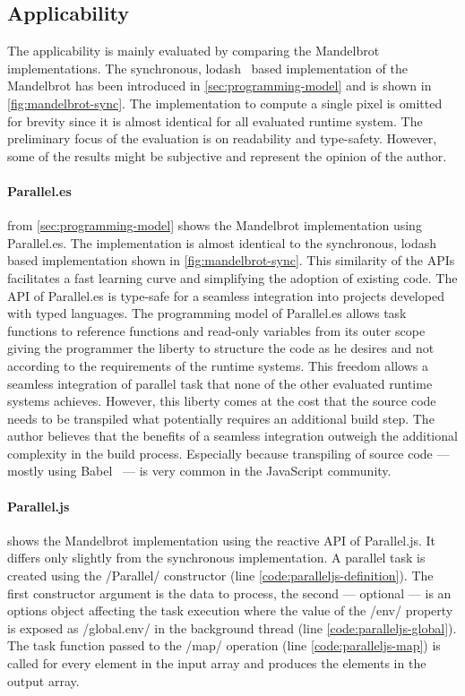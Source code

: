 \subsection{Applicability}
The applicability is mainly evaluated by comparing the Mandelbrot implementations. The synchronous, lodash~\cite{lodash} based implementation of the Mandelbrot has been introduced in \cref{sec:programming-model} and is shown in \cref{fig:mandelbrot-sync}. The implementation to compute a single pixel is  omitted for brevity since it is almost identical for all evaluated runtime system. The preliminary focus of the evaluation is on readability and type-safety. However, some of the results might be subjective and represent the opinion of the author. 

\paragraph{Parallel.es}
 from \cref{sec:programming-model} shows the Mandelbrot implementation using Parallel.es. The implementation is almost identical to the synchronous, lodash~\cite{lodash} based implementation shown in \cref{fig:mandelbrot-sync}. This similarity of the APIs facilitates a fast learning curve and simplifying the adoption of existing code. The API of Parallel.es is type-safe for a seamless integration into projects developed with typed languages. The programming model of Parallel.es allows task functions to reference functions and read-only variables from its outer scope giving the programmer the liberty to structure the code as he desires and not according to the requirements of the runtime systems. This freedom allows a seamless integration of parallel task that none of the other evaluated runtime systems achieves. However, this liberty comes at the cost that the source code needs to be transpiled what potentially requires an additional build step. The author believes that the benefits of a seamless integration outweigh the additional complexity in the build process. Especially because transpiling of source code --- mostly using Babel~\cite{babel} --- is very common in the JavaScript community. 

\paragraph{Parallel.js}
 shows the Mandelbrot implementation using the reactive API of Parallel.js. It differs only slightly from the synchronous implementation. A parallel task is created using the \javascriptinline/Parallel/ constructor (line \ref{code:paralleljs-definition}). The first constructor argument is the data to process, the second --- optional ---  is an options object affecting the task execution where the value of the \javascriptinline/env/ property is exposed as \javascriptinline/global.env/ in the background thread (line \ref{code:paralleljs-global}). The task function passed to the \javascriptinline/map/ operation (line \ref{code:paralleljs-map}) is called for every element in the input array and produces the elements in the output array.

